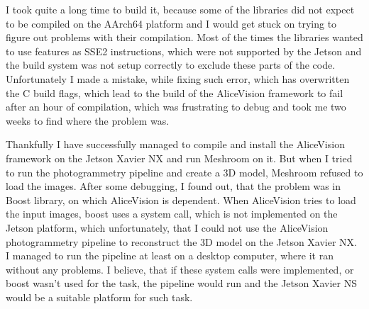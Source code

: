 I took quite a long time to build it, because some of the libraries did not expect to be compiled on the AArch64 platform and I would get stuck on trying to figure out  problems with their compilation.
Most of the times the libraries wanted to use features as SSE2 instructions, which were not supported by the Jetson and the build system was not setup correctly to exclude these parts of the code.
Unfortunately I made a mistake, while fixing such error, which has overwritten the C build flags, which lead to the build of the AliceVision framework to fail after an hour of compilation, which was frustrating to debug and took me two weeks to find where the problem was.

Thankfully I have successfully managed to compile and install the AliceVision framework on the Jetson Xavier NX and run Meshroom on it.
But when I tried to run the photogrammetry pipeline and create a 3D model, Meshroom refused to load the images.
After some debugging, I found out, that the problem was in Boost library, on which AliceVision is dependent.
When AliceVision tries to load the input images, boost uses a system call, which is not implemented on the Jetson platform, which unfortunately, that I could not use the AliceVision photogrammetry pipeline to reconstruct the 3D model on the Jetson Xavier NX.
I managed to run the pipeline at least on a desktop computer, where it ran without any problems.
I believe, that if these system calls were implemented, or boost wasn't used for the task, the pipeline would run and the Jetson Xavier NS would be a suitable platform for such task.








\endinput
